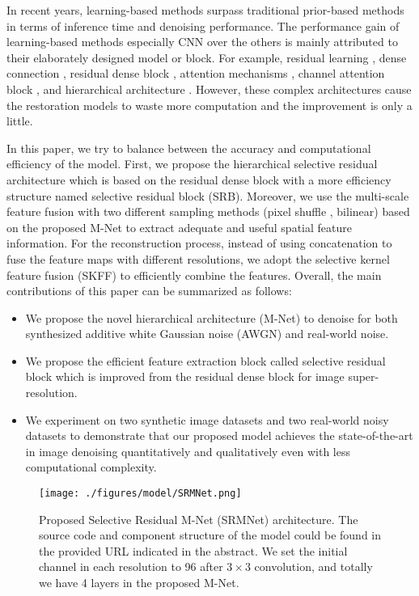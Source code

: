 \documentclass{article}
\begin{document}
In recent years, learning-based methods \cite{04,16,17} surpass traditional prior-based methods in terms of inference time and denoising performance. The performance gain of learning-based methods especially CNN over the others is mainly attributed to their elaborately designed model or block. For example, residual learning \cite{03,04}, dense connection \cite{05,06}, residual dense block \cite{07,08}, attention mechanisms \cite{09,10,11}, channel attention block \cite{09,12}, and hierarchical architecture \cite{13,14,15}. However, these complex architectures cause the restoration models to waste more computation and the improvement is only a little. 

In this paper, we try to balance between the accuracy and computational efficiency of the model. First, we propose the hierarchical selective residual architecture which is based on the residual dense block with a more efficiency structure named selective residual block (SRB). Moreover, we use the multi-scale feature fusion with two different sampling methods (pixel shuffle \cite{18}, bilinear) based on the proposed M-Net to extract adequate and useful spatial feature information. For the reconstruction process, instead of using concatenation to fuse the feature maps with different resolutions, we adopt the selective kernel feature fusion (SKFF) \cite{19,20} to efficiently combine the features. Overall, the main contributions of this paper can be summarized as follows:

\begin{itemize}
  \item We propose the novel hierarchical architecture (M-Net) to denoise for both synthesized additive white Gaussian noise (AWGN) and real-world noise.
  \item We propose the efficient feature extraction block called selective residual block which is improved from the residual dense block for image super-resolution.
  \item We experiment on two synthetic image datasets and two real-world noisy datasets to demonstrate that our proposed model achieves the state-of-the-art in image denoising quantitatively and qualitatively even with less computational complexity.
\end{itemize}

\begin{figure*}[!t]
\centering
	\texttt{[image: ./figures/model/SRMNet.png]}
	\caption{Proposed Selective Residual M-Net (SRMNet) architecture. The source code and component structure of the model could be found in the provided URL indicated in the abstract. We set the initial channel in each resolution to 96 after $3 \times 3$ convolution, and totally we have 4 layers in the proposed M-Net.}
	\label{SRMNet}
\end{figure*}
\end{document}
